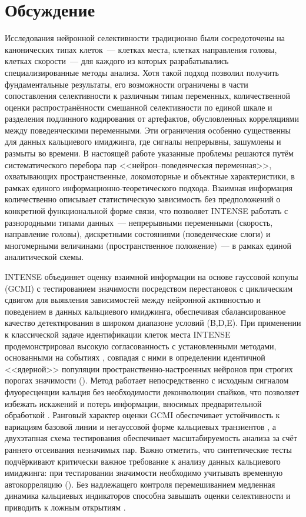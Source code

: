 \section{Обсуждение}
\label{sec:discussion}

Исследования нейронной селективности традиционно были сосредоточены на канонических типах клеток~--- клетках места, клетках направления головы, клетках скорости~--- для каждого из которых разрабатывались специализированные методы анализа. Хотя такой подход позволил получить фундаментальные результаты, его возможности ограничены в части сопоставления селективности к различным типам переменных, количественной оценки распространённости смешанной селективности по единой шкале и разделения подлинного кодирования от артефактов, обусловленных корреляциями между поведенческими переменными. Эти ограничения особенно существенны для данных кальциевого имиджинга, где сигналы непрерывны, зашумлены и размыты во времени. В настоящей работе указанные проблемы решаются путём систематического перебора пар <<нейрон--поведенческая переменная>>, охватывающих пространственные, локомоторные и объектные характеристики, в рамках единого информационно-теоретического подхода. Взаимная информация количественно описывает статистическую зависимость без предположений о конкретной функциональной форме связи, что позволяет INTENSE работать с разнородными типами данных~--- непрерывными переменными (скорость, направление головы), дискретными состояниями (поведенческие слоги) и многомерными величинами (пространственное положение)~--- в рамках единой аналитической схемы.

INTENSE объединяет оценку взаимной информации на основе гауссовой копулы (GCMI) с тестированием значимости посредством перестановок с циклическим сдвигом для выявления зависимостей между нейронной активностью и поведением в данных кальциевого имиджинга, обеспечивая сбалансированное качество детектирования в широком диапазоне условий (B,D,E). При применении к классической задаче идентификации клеток места INTENSE продемонстрировал высокую согласованность с установленными методами, основанными на событиях \cite{skaggs1993information}, совпадая с ними в определении идентичной <<ядерной>> популяции пространственно-настроенных нейронов при строгих порогах значимости (). Метод работает непосредственно с исходным сигналом флуоресценции кальция без необходимости деконволюции спайков, что позволяет избежать искажений и потерь информации, вносимых предварительной обработкой \cite{Rupprecht2021}. Ранговый характер оценки GCMI обеспечивает устойчивость к вариациям базовой линии и негауссовой форме кальциевых транзиентов \cite{gcmi}, а двухэтапная схема тестирования обеспечивает масштабируемость анализа за счёт раннего отсеивания незначимых пар. Важно отметить, что синтетические тесты подчёркивают критически важное требование к анализу данных кальциевого имиджинга: при тестировании значимости необходимо учитывать временную автокорреляцию (). Без надлежащего контроля перемешиванием медленная динамика кальциевых индикаторов способна завышать оценки селективности и приводить к ложным открытиям \cite{Wei2020}.

